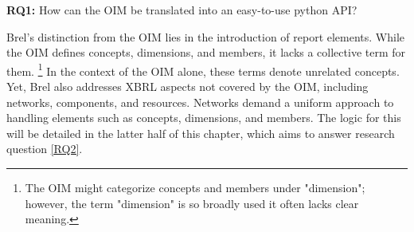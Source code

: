 \begin{displayquote}
    \textbf{RQ1:} How can the OIM be translated into an easy-to-use python API?
\end{displayquote}

Brel's distinction from the OIM lies in the introduction of report elements.
While the OIM defines concepts, dimensions, and members, it lacks a collective term for them.
\footnote{The OIM might categorize concepts and members under "dimension"; however, the term "dimension" is so broadly used it often lacks clear meaning.}
In the context of the OIM alone, these terms denote unrelated concepts.
Yet, Brel also addresses XBRL aspects not covered by the OIM, including networks, components, and resources.
Networks demand a uniform approach to handling elements such as concepts, dimensions, and members.
The logic for this will be detailed in the latter half of this chapter, which aims to answer research question \ref{RQ2}.


